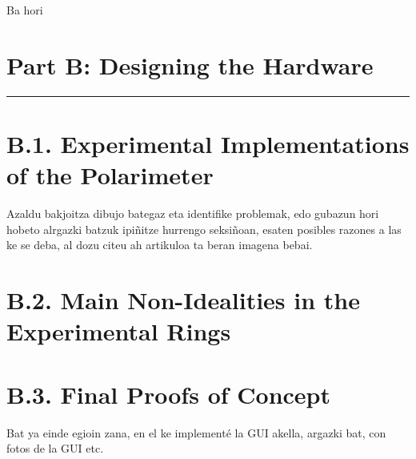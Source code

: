 \documentclass[11pt, a4paper, twoside]{article} %
\begin{document}
\newpage


Ba hori



\newpage




\section*{\centering \huge{Part B: Designing the Hardware}\vspace{-0.3cm}}
\noindent\rule{\textwidth}{0.4pt}


\section*{B.1. Experimental Implementations of the Polarimeter}
Azaldu bakjoitza dibujo bategaz eta identifike problemak, edo gubazun hori hobeto alrgazki batzuk ipiñitze hurrengo seksiñoan, esaten posibles razones a las ke se deba, al dozu citeu ah artikuloa ta beran imagena bebai.


\section*{B.2. Main Non-Idealities in the Experimental Rings}

\section*{B.3. Final Proofs of Concept}
Bat ya einde egioin zana, en el ke implementé la GUI akella, argazki bat, con fotos de la GUI etc.
\end{document}
